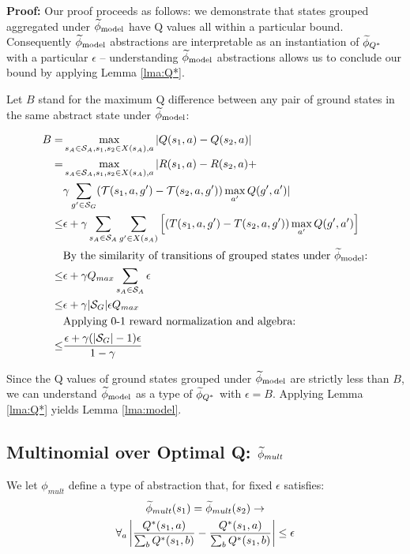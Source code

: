 {\bf Proof:} Our proof proceeds as follows: we demonstrate that states grouped aggregated under $\widetilde \phi_{\text{model}}$ have Q values all within a particular bound. Consequently $\widetilde \phi_{\text{model}}$ abstractions are interpretable as an instantiation of $\widetilde \phi_{Q^*}$ with a particular $\epsilon$ -- understanding $\widetilde \phi_{\text{model}}$ abstractions allows us to conclude our bound by applying Lemma \ref{lma:Q*}.


Let $B$ stand for the maximum Q difference between any pair of ground states in the same abstract state under $\widetilde \phi_{\text{model}}$:

\begin{align*}
B = &\max_{s_A \in \mathcal{S}_A, s_1, s_2 \in X(s_A), a} |Q(s_1, a) - Q(s_2, a)|\\
=&\max_{s_A \in \mathcal{S}_A, s_1, s_2 \in X(s_A), a}      |R(s_1, a) - R(s_2, a) +\\
& \gamma \sum_{g' \in \mathcal{S}_G}(\mathcal{T}(s_1,a,g')-\mathcal{T}(s_2, a, g'))\max_{a'}Q(g', a')|\\
\leq &\epsilon + \gamma \sum_{s_A \in \mathcal{S}_A}\sum_{g' \in X(s_A)}\left[(T(s_1, a, g')-T(s_2, a, g')) 		\max_{a'}Q(g', a')	\right]\\
&\text{By the similarity of transitions of grouped states under $\widetilde \phi_{\text{model}}$:}\\
 \leq &\epsilon + \gamma Q_{max} \sum_{s_A \in \mathcal{S}_A} \epsilon \\
\leq& \epsilon + \gamma|\mathcal{S}_G|\epsilon Q_{max}\\
&\text{Applying 0-1 reward normalization and algebra:}\\
 \leq & \frac{\epsilon + \gamma(|\mathcal{S}_G| - 1) \epsilon}{1-\gamma}
\end{align*}

Since the Q values of ground states grouped under $\widetilde \phi_{\text{model}}$ are strictly less than $B$, we can understand $\widetilde \phi_{\text{model}}$ as a type of $\widetilde \phi_{Q^*}$ with $\epsilon = B$. Applying Lemma \ref{lma:Q*} yields Lemma \ref{lma:model}.

\subsection{Multinomial over Optimal Q: $\widetilde \phi_{mult}$}

We let $\phi_{mult}$ define a type of abstraction that, for fixed $\epsilon$ satisfies:
\begin{multline}
\widetilde \phi_{mult}(s_1) = \widetilde \phi_{mult}(s_2) \rightarrow \\
\forall_{a} \left|\frac{Q^*(s_1,a)}{\sum_b Q^*(s_1,b)} - \frac{Q^*(s_1,a)}{\sum_b Q^*(s_1,b)}\right| \leq \epsilon
\end{multline}

